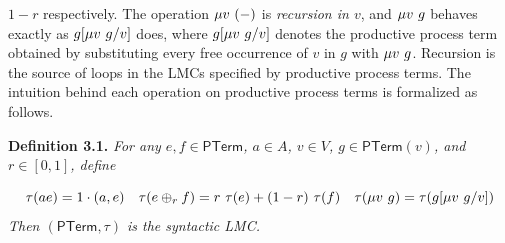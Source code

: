 \hypertarget{html:S3.SS0.SSS0.Px1.p2.m12}{}\({1-r}\) respectively. The operation %
\hypertarget{html:S3.SS0.SSS0.Px1.p2.m13}{}\({\mu v\leavevmode\nobreak\ (-)}\) is \emph{recursion in %
\hypertarget{html:S3.SS0.SSS0.Px1.p2.m14}{}\({v}\)}, and %
\hypertarget{html:S3.SS0.SSS0.Px1.p2.m15}{}\({\mu v\leavevmode\nobreak\ g}\) behaves exactly as %
\hypertarget{html:S3.SS0.SSS0.Px1.p2.m16}{}\({g[\mu v\leavevmode\nobreak\ g/v]}\) does, where %
\hypertarget{html:S3.SS0.SSS0.Px1.p2.m17}{}\({g[\mu v\leavevmode\nobreak\ g/v]}\) denotes the productive process term obtained by substituting every free occurrence of %
\hypertarget{html:S3.SS0.SSS0.Px1.p2.m18}{}\({v}\) in %
\hypertarget{html:S3.SS0.SSS0.Px1.p2.m19}{}\({g}\) with %
\hypertarget{html:S3.SS0.SSS0.Px1.p2.m20}{}\({\mu v\leavevmode\nobreak\ g}\). Recursion is the source of loops in the LMCs specified by productive process terms. The intuition behind each operation on productive process terms is formalized as follows.
\par\medskip
\hypertarget{html:S3.Thmtheorem1}{} \par\noindent\textbf{\textbf{Definition 3.1}\textbf{.}}\quad  %
\hypertarget{html:S3.Thmtheorem1.p1}{} \emph{For any %
\hypertarget{html:S3.Thmtheorem1.p1.m1}{}\({e,f\in\mathsf{PTerm}}\), %
\hypertarget{html:S3.Thmtheorem1.p1.m2}{}\({a\in A}\), %
\hypertarget{html:S3.Thmtheorem1.p1.m3}{}\({v\in V}\), %
\hypertarget{html:S3.Thmtheorem1.p1.m4}{}\({g\in\mathsf{PTerm}(v)}\), and %
\hypertarget{html:S3.Thmtheorem1.p1.m5}{}\({r\in[0,1]}\), define}
\par\medskip
\hypertarget{html:S8.EGx2}{} %
\hypertarget{html:S3.Ex2}{}  %
\hypertarget{html:S3.Ex2.m1}{}\[\displaystyle\tau(ae)=1\cdot(a,e)\quad\tau(e\oplus_{r}f)=r\leavevmode\nobreak\ \tau(e)+(1-r)\leavevmode\nobreak\ \tau(f)\quad\tau(\mu v\leavevmode\nobreak\ g)=\tau(g[\mu v\leavevmode\nobreak\ g/v])\]    \emph{Then %
\hypertarget{html:S3.Thmtheorem1.p1.m6}{}\({(\mathsf{PTerm},\tau)}\) is the \emph{syntactic LMC}.}
